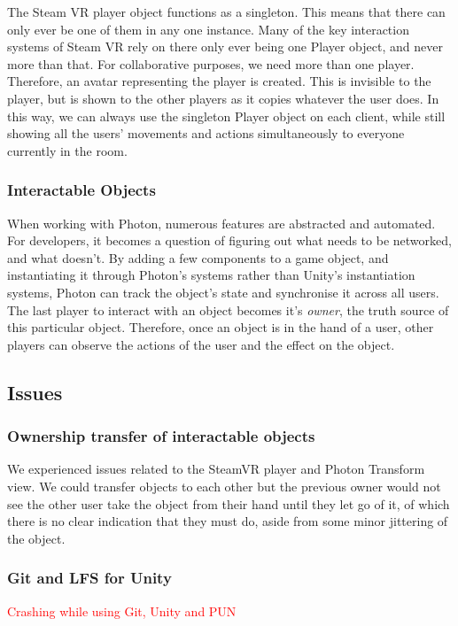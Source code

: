 The Steam VR player object functions as a singleton. This means that there can only ever be one of them in any one instance. Many of the key interaction systems of Steam VR rely on there only ever being one Player object, and never more than that. For collaborative purposes, we need more than one player. Therefore, an avatar representing the player is created. This is invisible to the player, but is shown to the other players as it copies whatever the user does. In this way, we can always use the singleton Player object on each client, while still showing all the users' movements and actions simultaneously to everyone currently in the room. 

\subsubsection{Interactable Objects}
When working with Photon, numerous features are abstracted and automated. For developers, it becomes a question of figuring out what needs to be networked, and what doesn't. By adding a few components to a game object, and instantiating it through Photon's systems rather than Unity's instantiation systems, Photon can track the object's state and synchronise it across all users. The last player to interact with an object becomes it's \textit{owner}, the truth source of this particular object. Therefore, once an object is in the hand of a user, other players can observe the actions of the user and the effect on the object.

\subsection{Issues}

\subsubsection{Ownership transfer of interactable objects}
We experienced issues related to the SteamVR player and Photon Transform view. We could transfer objects to each other but the previous owner would not see the other user take the object from their hand until they let go of it, of which there is no clear indication that they must do, aside from some minor jittering of the object.

\subsubsection{Git and LFS for Unity}
\textcolor{red}{Crashing while using Git, Unity and PUN}


